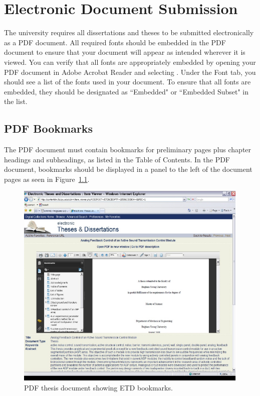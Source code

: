 \chapter{Electronic Document Submission}
\label{ap:elect_doc}

The university requires all dissertations and theses to be submitted electronically as 
a PDF document. All required fonts should be embedded in the PDF document to ensure that
your document will appear as intended wherever it is viewed. You can verify that all fonts
are appropriately embedded by opening your PDF document in Adobe Acrobat Reader and selecting
{}. Under the Font tab, you should see a list of the fonts used in your document.
To ensure that all fonts are embedded, they should be designated as ``Embedded" or ``Embedded 
Subset" in the list.

\section{PDF Bookmarks}
The PDF document must contain bookmarks for preliminary pages plus chapter headings and 
subheadings, as listed in the Table of Contents. In the PDF document, bookmarks should be 
displayed in a panel to the left of the document pages as seen in Figure~\ref{fig:PDF_doc}. 

\begin{figure}[htbp]
\centering
\includegraphics[width=4.5in]{figures/PDF_doc}
\caption{PDF thesis document showing ETD bookmarks.}
\label{fig:PDF_doc}
\end{figure}

